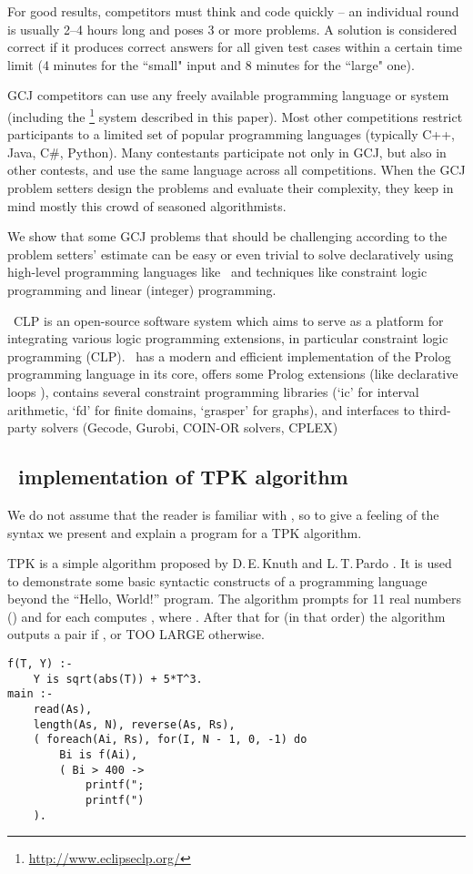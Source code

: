 \documentclass{acm_proc_article-sp}
\begin{document}
For good results, competitors must think and code quickly -- an individual round is usually 2--4 hours long and poses 3 or more problems. 
A solution is considered correct if it produces correct answers for all given test cases within a certain time limit 
(4 minutes for the ``small" input and 8 minutes for the ``large" one).

GCJ competitors can use any freely available programming language or system (including the \eclipse\footnote{\url{http://www.eclipseclp.org/}} system described in this paper). 
Most other competitions restrict participants to a limited set of popular programming languages (typically C++, Java, C\#, Python).
Many contestants participate not only in GCJ, but also in other contests, and use the same language across all competitions.
When the GCJ problem setters design the problems and evaluate their complexity, they keep in mind mostly this crowd of seasoned algorithmists. 

We show that some GCJ problems that should be challenging according to the problem setters' estimate 
can be easy or even trivial to 
solve declaratively using high-level programming languages like \eclipse\ and techniques like constraint logic programming and linear (integer) programming.

\eclipse\ CLP\cite{schimpf2012eclipse,apt2007constraint}
is an open-source software system which aims to serve as a platform for integrating various logic programming extensions, in particular constraint logic programming (CLP).
\eclipse\ has a modern and efficient implementation of the Prolog programming language in its core, offers some Prolog extensions (like declarative loops \cite{schimpf2002loops}),
contains several constraint programming libraries (`ic' for interval arithmetic, `fd' for finite domains, `grasper' for graphs), and
interfaces to third-party solvers (Gecode, Gurobi, COIN-OR solvers, CPLEX) \cite{eclipse-library-manual}

\subsection*{\eclipse\ implementation of TPK algorithm}

We do not assume that the reader is familiar with \eclipse, so to give a feeling of the syntax we present and explain a program for a TPK algorithm.

TPK is a simple algorithm proposed by D.\,E.\,Knuth and L.\,T.\,Pardo  \cite{knuth1976early}. 
It is used to demonstrate some basic syntactic constructs of a programming language beyond the ``Hello, World!'' program.
The algorithm prompts for 11 real numbers () and for each  computes , where .
After that for  (in that order) the algorithm outputs a pair  if , or  TOO LARGE otherwise.
\clearpage
\begin{lstlisting}[caption={TPK algorithm in \eclipse}]
f(T, Y) :-
    Y is sqrt(abs(T)) + 5*T^3.
main :-
    read(As), 
    length(As, N), reverse(As, Rs),
    ( foreach(Ai, Rs), for(I, N - 1, 0, -1) do
        Bi is f(Ai),
        ( Bi > 400 ->
            printf(";
            printf(")
    ).
\end{lstlisting}
\end{document}
